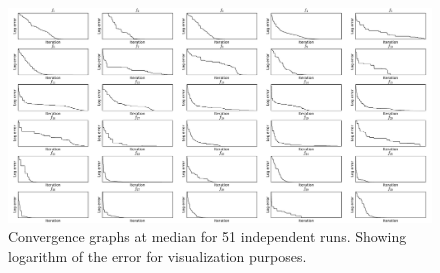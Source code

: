 \documentclass[graybox]{svmult}
\begin{document}
\begin{figure}[!ht]
\includegraphics[width=\linewidth]{img/converg.pdf}
\caption{Convergence graphs at median for 51 independent runs. Showing logarithm of the error for visualization purposes.}
\label{fig:converg}       %
\end{figure}
\end{document}
